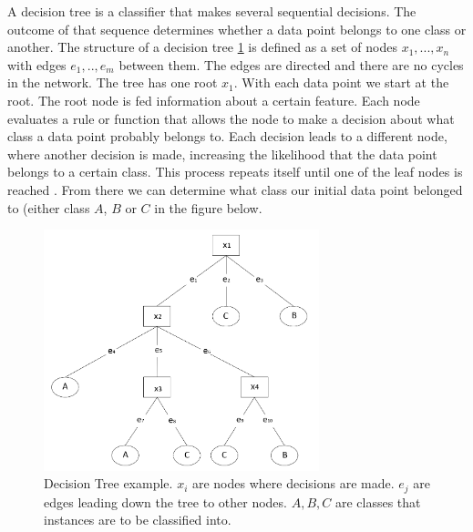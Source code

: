 A decision tree is a classifier that makes several sequential decisions. The outcome of that sequence determines whether a data point belongs to one class or another. The structure of a decision tree \ref{fig:DT} is defined as a set of nodes ${x_1, ... , x_n}$ with edges ${e_1, .., e_{m}}$ between them. The edges are directed and there are no cycles in the network. The tree has one root $x_1$. With each data point we start at the root. The root node is fed information about a certain feature. Each node evaluates a rule or function that allows the node to make a decision about what class a data point probably belongs to. Each decision leads to a different node, where another decision is made, increasing the likelihood that the data point belongs to a certain class. This process repeats itself until one of the leaf nodes is reached \cite{safavian1991survey}. From there we can determine what class our initial data point belonged to (either class $A$, $B$ or $C$ in the figure below. 

\begin{figure}[H]
    \includegraphics[width=80mm]{./img/decisiontree.png}
    \caption{\footnotesize{Decision Tree example. $x_i$ are nodes where decisions are made. $e_j$ are edges leading down the tree to other nodes. $A,B,C$ are classes that instances are to be classified into.}}
    \label{fig:DT}
\end{figure}

